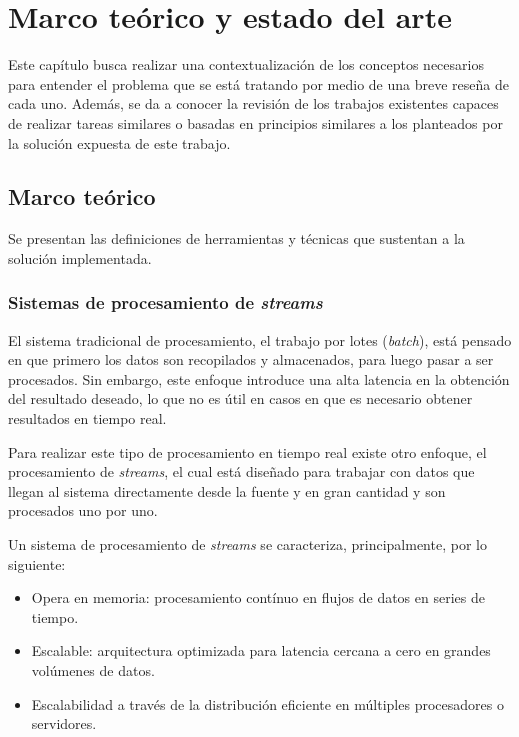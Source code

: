 \chapter{Marco teórico y estado del arte}
\label{cap:MarcTeorico}

Este capítulo busca realizar una contextualización de los conceptos necesarios para entender el problema que se está tratando por medio de una breve reseña de cada uno. Además, se da a conocer la revisión de los trabajos existentes capaces de realizar tareas similares o basadas en principios similares a los planteados por la solución expuesta de este trabajo.

\section{Marco teórico}
\label{intro:motivacion:marco}

Se presentan las definiciones de herramientas y técnicas que sustentan a la solución implementada.

\subsection{Sistemas de procesamiento de \textit{streams}}
\label{subsec:SPS}

El sistema tradicional de procesamiento, el trabajo por lotes (\textit{batch}), está pensado en que primero los datos son recopilados y almacenados, para luego pasar a ser procesados. Sin embargo, este enfoque introduce una alta latencia en la obtención del resultado deseado, lo que no es útil en casos en que es necesario obtener resultados en tiempo real.

Para realizar este tipo de procesamiento en tiempo real existe otro enfoque, el procesamiento de \textit{streams}, el cual está diseñado para trabajar con datos que llegan al sistema directamente desde la fuente y en gran cantidad y son procesados uno por uno.

Un sistema de procesamiento de \textit{streams} se caracteriza, principalmente, por lo siguiente:

\begin{itemize}
\item Opera en memoria: procesamiento contínuo en flujos de datos en series de tiempo.
\item Escalable: arquitectura optimizada para latencia cercana a cero en grandes volúmenes de datos.
\item Escalabilidad a través de la distribución eficiente en múltiples procesadores o servidores.
\end{itemize}

